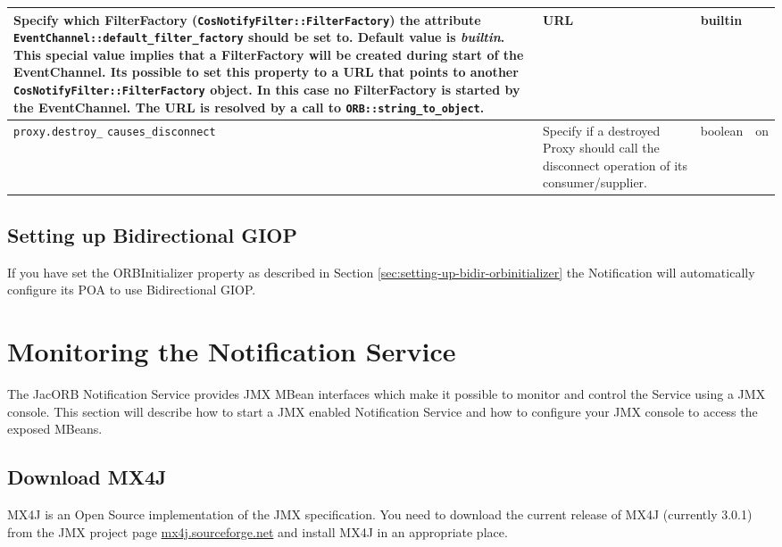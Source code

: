 \begin{small}
\begin{longtable}{|p{5cm}|p{7.5cm}|p{1.5cm}|p{1.5cm}|}
    Specify which FilterFactory (\texttt{CosNotifyFilter::FilterFactory}) the
    attribute \texttt{EventChannel::\-default\_filter\_factory} should be set to.
    Default value is \emph{builtin}. This special value implies that a
    FilterFactory will be created during start of the EventChannel.
    Its possible to set this property to a URL that points to another
    \texttt{CosNotifyFilter::FilterFactory} object. In this case no FilterFactory
    is started by the EventChannel. The URL is resolved by a call
    to \texttt{ORB::string\_to\_object}. &

    URL & builtin \\ \hline

    \verb"proxy.destroy_"
    \verb"causes_disconnect" &

    Specify if a destroyed Proxy should call the disconnect operation
    of its consumer/supplier. &

    boolean & on \\ \hline
  \end{longtable}
\end{small}

\subsection{Setting up Bidirectional GIOP}

If you have set the ORBInitializer property as described in Section \ref{sec:setting-up-bidir-orbinitializer}
the Notification will automatically configure its POA to use Bidirectional GIOP.

\section{Monitoring the Notification Service}
\label{sec:ntfy-monitoring}

The JacORB Notification Service provides JMX MBean interfaces which make it possible to monitor and control the Service using a JMX console. This section will describe how to start a JMX enabled Notification Service and how to configure your JMX console to access the exposed MBeans.

\subsection{Download MX4J}

MX4J is an Open Source implementation of the JMX specification. You need to download the current release of MX4J (currently 3.0.1) from the JMX project page \href{mx4j.sourceforge.net}{mx4j.sourceforge.net} and install MX4J in an appropriate place.

